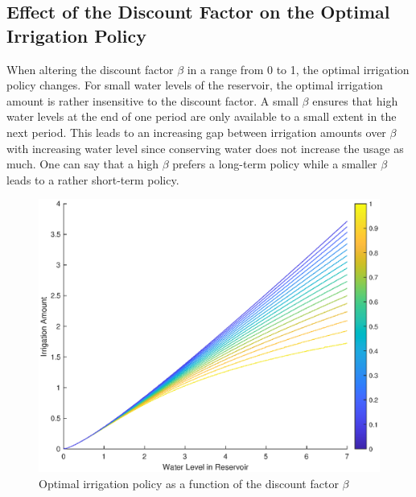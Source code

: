 \documentclass[12pt, a4paper, oneside]{article}
\begin{document}
\subsection{Effect of the Discount Factor on the Optimal Irrigation Policy}
When altering the discount factor $\beta$ in a range from 0 to 1, the optimal irrigation policy changes. %
For small water levels of the reservoir, the optimal irrigation amount is rather insensitive to the discount factor. 
A small $\beta$ ensures that high water levels at the end of one period are only available to a small extent in the next period. 
This leads to an increasing gap between irrigation amounts over $\beta$ with increasing water level since conserving water does not increase the usage as much. 
One can say that a high $\beta$ prefers a long-term policy while a smaller $\beta$ leads to a rather short-term policy.
\begin{figure}[ht]
	\includegraphics[width=1\textwidth]{figures/optimum-policy-over-beta.eps}
	\caption{Optimal irrigation policy as a function of the discount factor $\beta$}
	\label{fig:optimal-irrigation-beta}
\end{figure}
\newpage
\end{document}
